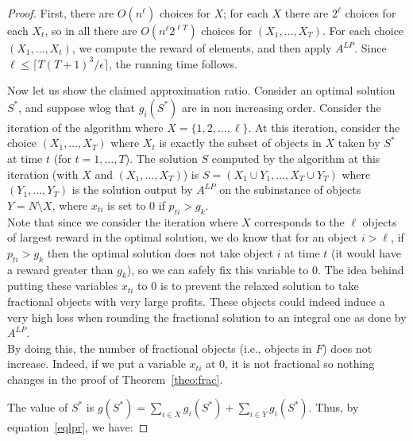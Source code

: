 \documentclass[a4paper]{book}
\newtheorem{proof}{\noindent{\bf Proof.} }
\begin{document}
\begin{proof}
First, there are $O(n^\ell)$ choices for $X$; for each $X$ there are $2^\ell$ choices for each $X_t$, so in all there are $O(n^\ell 2^{\ell T})$ choices for $(X_1,\dots,X_T)$. For each choice $(X_1,\dots,X_t)$, we compute the reward of elements, and then apply $A^{LP}$. Since $\ell\leq \lceil T(T+1)^3/\epsilon\rceil$, the running time follows. 

Now let us show the claimed approximation ratio. Consider an optimal solution $S^*$, and suppose wlog that $g_i(S^*)$ are in non increasing order. Consider the iteration of the algorithm where $X=\{1,2,\dots,\ell\}$. At this iteration, consider the choice $(X_1,\dots,X_T)$ where $X_t$ is exactly the subset of objects in $X$ taken by $S^*$ at time $t$ (for $t=1,\dots,T$). The solution $S$ computed by the algorithm at this iteration (with $X$ and $(X_1,\dots,X_T)$) is $S=(X_1\cup Y_1,\dots,X_T\cup Y_T)$ where $(Y_1,\dots,Y_T)$ is the solution output by $A^{LP}$ on the subinstance of objects $Y=N\setminus X$, where $x_{ti}$ is set to 0 if $p_{ti}>g_k$.\\


Note that since we consider the iteration where $X$ corresponds to the $\ell$ objects of largest reward in the optimal solution, we do know that for an object $i>\ell$, if $p_{ti} > g_{k}$ then the optimal solution does not take object $i$ at time $t$ (it would have a reward greater than $g_k$), so we can safely fix this variable to 0. The idea behind putting these variables $x_{ti}$ to $0$ is to prevent the relaxed solution to take fractional objects with very large profits. These objects could indeed induce a very high loss when rounding the fractional solution to an integral one as done by $A^{LP}$. \\
By doing this, the number of fractional objects (i.e., objects in $F$) does not increase. Indeed, if we put a variable $x_{ti}$ at $0$, it is not fractional so nothing changes in the proof of Theorem~\ref{theo:frac}.


 

The value of $S^*$ is $g(S^*)=\sum_{i\in X} g_i(S^*)+\sum_{i\in Y} g_i(S^*)$. Thus, by equation~\ref{eqlpr}, we have:


\end{proof}
\end{document}
